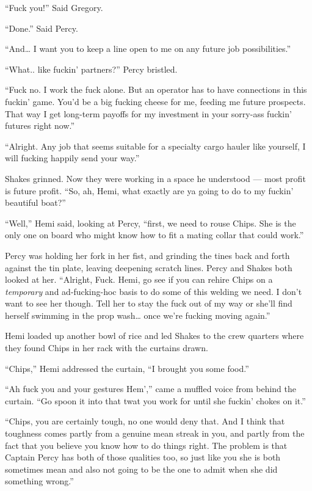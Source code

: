 \documentclass[]{scrbook}
\begin{document}
``Fuck you!'' Said Gregory.

``Done.'' Said Percy.

``And\ldots{} I want you to keep a line open to me on any future job
possibilities.''

``What.. like fuckin' partners?'' Percy bristled.

``Fuck no. I work the fuck alone. But an operator has to have
connections in this fuckin' game. You'd be a big fucking cheese for me,
feeding me future prospects. That way I get long-term payoffs for my
investment in your sorry-ass fuckin' futures right now.''

``Alright. Any job that seems suitable for a specialty cargo hauler like
yourself, I will fucking happily send your way.''

Shakes grinned. Now they were working in a space he understood --- most
profit is future profit. ``So, ah, Hemi, what exactly are ya going to do
to my fuckin' beautiful boat?''

``Well,'' Hemi said, looking at Percy, ``first, we need to rouse Chips.
She is the only one on board who might know how to fit a mating collar
that could work.''

Percy was holding her fork in her fist, and grinding the tines back and
forth against the tin plate, leaving deepening scratch lines. Percy and
Shakes both looked at her. ``Alright, Fuck. Hemi, go see if you can
rehire Chips on a \emph{temporary} and ad-fucking-hoc basis to do some
of this welding we need. I don't want to see her though. Tell her to
stay the fuck out of my way or she'll find herself swimming in the prop
wash\ldots{} once we're fucking moving again.''

Hemi loaded up another bowl of rice and led Shakes to the crew quarters
where they found Chips in her rack with the curtains drawn.

``Chips,'' Hemi addressed the curtain, ``I brought you some food.''

``Ah fuck you and your gestures Hem','' came a muffled voice from behind
the curtain. ``Go spoon it into that twat you work for until she fuckin'
chokes on it.''

``Chips, you are certainly tough, no one would deny that. And I think
that toughness comes partly from a genuine mean streak in you, and
partly from the fact that you believe you know how to do things right.
The problem is that Captain Percy has both of those qualities too, so
just like you she is both sometimes mean and also not going to be the
one to admit when she did something wrong.''
\end{document}

